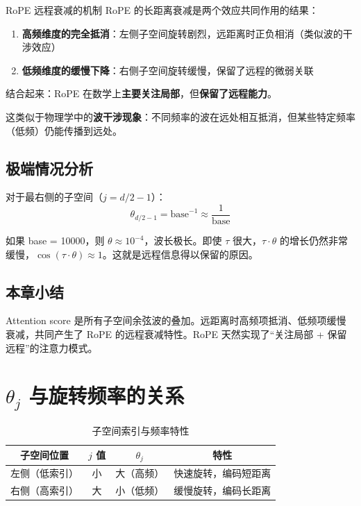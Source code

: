 \documentclass[a4paper]{article}
\begin{document}
\begin{importantbox}{RoPE 远程衰减的机制}
RoPE 的长距离衰减是两个效应共同作用的结果：
\begin{enumerate}
  \item \textbf{高频维度的完全抵消}：左侧子空间旋转剧烈，远距离时正负相消（类似波的干涉效应）
  \item \textbf{低频维度的缓慢下降}：右侧子空间旋转缓慢，保留了远程的微弱关联
\end{enumerate}
结合起来：RoPE 在数学上\textbf{主要关注局部}，但\textbf{保留了远程能力}。
\end{importantbox}

这类似于物理学中的\textbf{波干涉现象}：不同频率的波在远处相互抵消，但某些特定频率（低频）仍能传播到远处。

\subsection{极端情况分析}

对于最右侧的子空间（$j = d/2 - 1$）：
$$
\theta_{d/2-1} = \text{base}^{-1} \approx \frac{1}{\text{base}}
$$

如果 base = 10000，则 $\theta \approx 10^{-4}$，波长极长。即使 $\tau$ 很大，$\tau \cdot \theta$ 的增长仍然非常缓慢，$\cos(\tau \cdot \theta) \approx 1$。这就是远程信息得以保留的原因。

\subsection{本章小结}

Attention score 是所有子空间余弦波的叠加。远距离时高频项抵消、低频项缓慢衰减，共同产生了 RoPE 的远程衰减特性。RoPE 天然实现了``关注局部 + 保留远程''的注意力模式。

\section{$\theta_j$ 与旋转频率的关系}

\begin{table}[H]
\centering
\caption{子空间索引与频率特性}
\begin{tabular}{cccc}
\toprule
\textbf{子空间位置} & \textbf{$j$ 值} & \textbf{$\theta_j$} & \textbf{特性} \\
\midrule
左侧（低索引） & 小 & 大（高频） & 快速旋转，编码短距离 \\
右侧（高索引） & 大 & 小（低频） & 缓慢旋转，编码长距离 \\
\bottomrule
\end{tabular}
\end{table}
\end{document}

